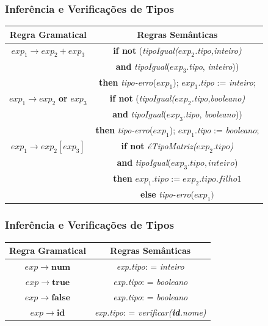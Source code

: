 \documentclass[table]{beamer}
\begin{document}
\begin{frame}
   \frametitle{Inferência e Verificações de Tipos}
   \begin{table}
      \begin{tabular}{c|c}
      \textbf{Regra Gramatical} & \textbf{Regras Semânticas} \\
      \hline
      \hline
      $\textit{exp}_{1}\to\textit{exp}_{2}+\textit{exp}_{3}$ & \textbf{if not} (\textit{tipoIgual($\textit{exp}_{2}$.tipo,inteiro)} \\
      & \textbf{and} \textit{tipoIgual}($\textit{exp}_{3}$.\textit{tipo}, \textit{inteiro})) \\ 
      & \textbf{then} \textit{tipo-erro}($\textit{exp}_{1}$); $\textit{exp}_{1}$.\textit{tipo} := \textit{inteiro}; \\
      \hline
      $\textit{exp}_{1}\to\textit{exp}_{2}$\textbf{ or }$\textit{exp}_{3}$ & \textbf{if not} (\textit{tipoIgual($\textit{exp}_{2}$.tipo,booleano)} \\
      & \textbf{and} \textit{tipoIgual}($\textit{exp}_{3}$.\textit{tipo}, \textit{booleano})) \\ 
      & \textbf{then} \textit{tipo-erro}($\textit{exp}_{1}$); $\textit{exp}_{1}$.\textit{tipo} := \textit{booleano}; \\
      \hline
      $\textit{exp}_{1}\to\textit{exp}_{2} [ \textit{exp}_{3} ] $ & \textbf{if not} \textit{éTipoMatriz($exp_{2}.tipo$)} \\
      & \textbf{and} \textit{tipoIgual}($exp_{3}.tipo, inteiro$) \\
      & \textbf{then} $exp_{1}.tipo := exp_{2}.tipo.filho1$ \\
      & \textbf{else} \textit{tipo-erro}($exp_{1})$ \\
      \hline
      \end{tabular}
   \end{table}
\end{frame}

\begin{frame}
   \frametitle{Inferência e Verificações de Tipos}
   \begin{table}
      \begin{tabular}{c|c}
      \textbf{Regra Gramatical} & \textbf{Regras Semânticas} \\
      \hline
      \hline
      $exp\to\textbf{num}$ & \textit{exp.tipo}: = \textit{inteiro} \\
      \hline
      $exp\to\textbf{true}$ & \textit{exp.tipo}: = \textit{booleano} \\
      \hline
      $exp\to\textbf{false}$ & \textit{exp.tipo}: = \textit{booleano} \\
      \hline
      $exp\to\textbf{id}$ & \textit{exp.tipo}: = \textit{verificar(\textbf{id}.nome)} \\
      \hline
      \end{tabular}
   \end{table}
\end{frame}
\end{document}
